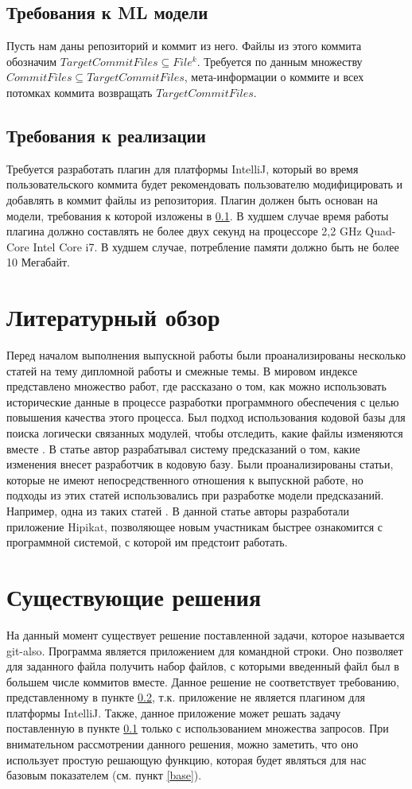 \documentclass[times]{itmo-student-thesis}
\begin{document}
\subsection{Требования к ML модели}\label{ml-model-req}
Пусть нам даны репозиторий и коммит из него. Файлы из этого коммита обозначим $TargetCommitFiles \subseteq File^k$. Требуется по данным множеству $CommitFiles \subseteq TargetCommitFiles$, мета-информации о коммите и всех потомках коммита возвращать $TargetCommitFiles$.
\subsection{Требования к реализации}\label{impl-req}
Требуется разработать плагин для платформы IntelliJ, который во время пользовательского коммита будет рекомендовать пользователю модифицировать и добавлять в коммит файлы из репозитория. Плагин должен быть основан на модели, требования к которой изложены в \ref{ml-model-req}. В худшем случае время работы плагина должно составлять не более двух секунд на процессоре 2,2 GHz Quad-Core Intel Core i7. В худшем случае, потребление памяти должно быть не более 10 Мегабайт.
\section{Литературный обзор}
Перед началом выполнения выпускной работы были проанализированы несколько статей на тему дипломной работы и смежные темы. В мировом индексе представлено множество работ, где рассказано о том, как можно использовать исторические данные в процессе разработки программного обеспечения с целью повышения качества этого процесса. Был подход использования кодовой базы для поиска логически связанных модулей, чтобы отследить, какие файлы изменяются вместе \cite{logical-modules}. В статье \cite{source-change} автор разрабатывал систему предсказаний о том, какие изменения внесет разработчик в кодовую базу. Были проанализированы статьи, которые не имеют непосредственного отношения к выпускной работе, но подходы из этих статей использовались при разработке модели предсказаний. Например, одна из таких статей \cite{project-memory}. В данной статье авторы разработали приложение Hipikat, позволяющее новым участникам быстрее ознакомится с программной системой, с которой им предстоит работать.
\section{Существующие решения}
На данный момент существует решение поставленной задачи, которое называется git-also. Программа является приложением для командной строки. Оно позволяет для заданного файла получить набор файлов, с которыми введенный файл был в большем числе коммитов вместе. Данное решение не соответствует требованию, представленному в пункте \ref{impl-req}, т.к. приложение не является плагином для платформы IntelliJ. Также, данное приложение может решать задачу поставленную в пункте \ref{ml-model-req} только с использованием множества запросов. При внимательном рассмотрении данного решения, можно заметить, что оно использует простую решающую функцию, которая будет являться для нас базовым показателем (см. пункт \ref{base}).
\end{document}
